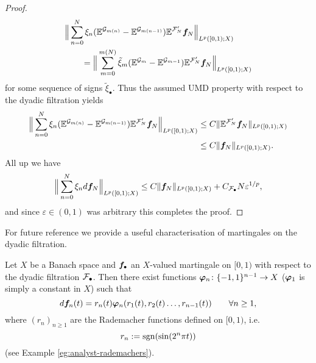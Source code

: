 \begin{proof}
\begin{equation*}
    \begin{aligned}
      &\Big\| \sum_{n=0}^{N} \xi_{n} (\mathbb{E}^{\mathcal{G}_{m(n)}} - \mathbb{E}^{\mathcal{G}_{m(n-1)}}) \mathbb{E}^{\mathcal{F}'_{N}} \bm{f}_{N} \Big\|_{L^p([0,1);X)} \\
      &\qquad = \Big\| \sum_{m=0}^{m(N)} \tilde{\xi}_{m} (\mathbb{E}^{\mathcal{G}_{m}} - \mathbb{E}^{\mathcal{G}_{m-1}}) \mathbb{E}^{\mathcal{F}'_{N}} \bm{f}_{N} \Big\|_{L^p([0,1);X)}
    \end{aligned}
  \end{equation*}
  for some sequence of signs $\tilde{\xi}_{\bullet}$.
  Thus the assumed UMD property with respect to the dyadic filtration yields
  \begin{equation*}
    \begin{aligned}
      \Big\| \sum_{n=0}^{N} \xi_{n} (\mathbb{E}^{\mathcal{G}_{m(n)}} - \mathbb{E}^{\mathcal{G}_{m(n-1)}}) \mathbb{E}^{\mathcal{F}'_{N}} \bm{f}_{N} \Big\|_{L^p([0,1);X)}
      &\leq C \|\mathbb{E}^{\mathcal{F}'_{N}} \bm{f}_{N}\|_{L^p([0,1);X)} \\
      &\leq C\|\bm{f}_{N}\|_{L^p([0,1);X)}.
    \end{aligned}
    \end{equation*}
    All up we have
    \begin{equation*}
      \Big\| \sum_{n=0}^{N} \xi_{n} d\bm{f}_{N} \Big\|_{L^p([0,1);X)} \leq C\|\bm{f}_{N}\|_{L^p([0,1);X)} + C_{\mathcal{F}_{\bullet}} N \varepsilon^{1/p},
    \end{equation*}
    and since $\varepsilon \in (0,1)$ was arbitrary this completes the proof.
  \end{proof}

  For future reference we provide a useful characterisation of martingales on the dyadic filtration.

  \begin{prop}\label{prop:PW-martingales}
    Let $X$ be a Banach space and $\bm{f}_{\bullet}$ an $X$-valued martingale on $[0,1)$ with respect to the dyadic filtration $\mathcal{F}_{\bullet}$.
    Then there exist functions $\bm{\varphi}_{n} \colon \{-1,1\}^{n-1} \to X$ ($\bm{\varphi}_{1}$ is simply a constant in $X$) such that
    \begin{equation*}
      d\bm{f}_{n}(t) = r_{n}(t) \bm{\varphi}_{n}(r_1(t), r_{2}(t)\ldots, r_{n-1}(t)) \qquad \forall n \geq 1,
    \end{equation*}
    where $(r_{n})_{n \geq 1}$ are the Rademacher functions defined on $[0,1)$, i.e.
    \begin{equation*}
      r_{n} := \operatorname{sgn}(\sin(2^n \pi t))
    \end{equation*}
    (see Example \ref{eg:analyst-rademachers}).
  \end{prop}

